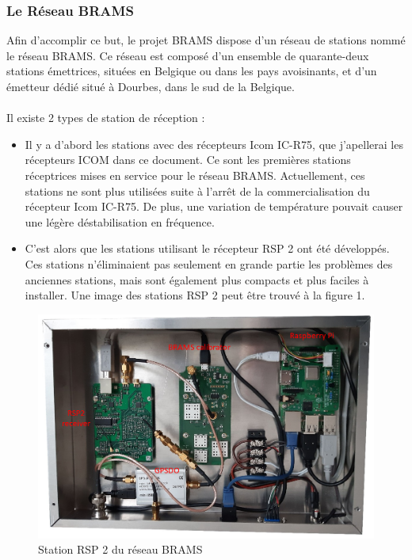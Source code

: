 \documentclass[11pt]{article}
\begin{document}
\subsubsection{Le Réseau BRAMS}

Afin d'accomplir ce but, le projet BRAMS dispose d'un réseau de stations nommé le réseau BRAMS.
Ce réseau est composé d'un ensemble de quarante-deux stations émettrices, situées en Belgique ou dans les pays avoisinants, et d'un émetteur dédié situé à Dourbes, dans le sud de la Belgique.\\
\\
Il existe 2 types de station de réception :
\begin{itemize}
    \item Il y a d'abord les stations avec des récepteurs Icom IC-R75, que j'apellerai les récepteurs ICOM dans ce document.
          Ce sont les premières stations réceptrices mises en service pour le réseau BRAMS.
          Actuellement, ces stations ne sont plus utilisées suite à l'arrêt de la commercialisation du récepteur Icom IC-R75.
          De plus, une variation de température pouvait causer une légère déstabilisation en fréquence.
    \item C'est alors que les stations utilisant le récepteur RSP 2 ont été développés.
          Ces stations n'éliminaient pas seulement en grande partie les problèmes des anciennes stations, mais sont également plus compacts et plus faciles à installer.
          Une image des stations RSP 2 peut être trouvé à la figure 1.
\end{itemize}

\begin{figure}[t]
    \begin{center}
        \includegraphics[scale=0.58]{RPS2.png}
        \caption{Station RSP 2 du réseau BRAMS}
    \end{center}
\end{figure}
\end{document}

